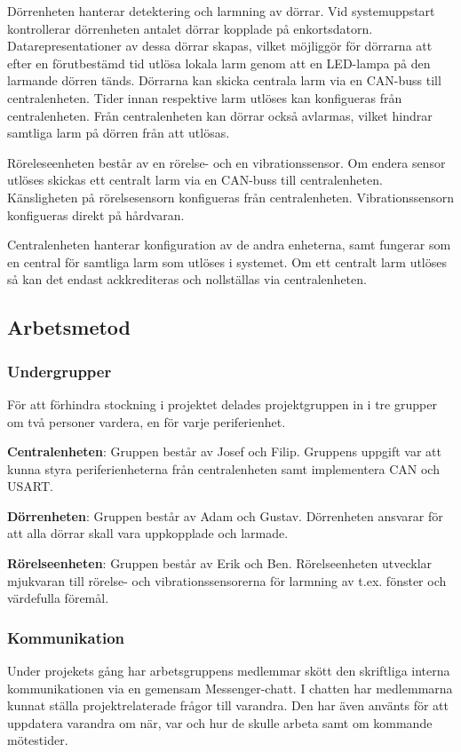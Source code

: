 \documentclass{article}
\begin{document}
Dörrenheten hanterar detektering och larmning av dörrar. Vid systemuppstart kontrollerar
dörrenheten antalet dörrar kopplade på enkortsdatorn. Datarepresentationer av
  dessa dörrar skapas, vilket möjliggör för dörrarna att efter en förutbestämd 
  tid utlösa lokala larm genom att en LED-lampa på den larmande dörren tänds. 
  Dörrarna kan skicka centrala larm via en CAN-buss till 
  centralenheten. Tider innan respektive larm utlöses kan konfigueras från centralenheten. 
  Från centralenheten kan dörrar också avlarmas, vilket hindrar 
  samtliga larm på dörren från att utlösas.

Röreleseenheten består av en rörelse- och en vibrationssensor. Om endera sensor 
utlöses skickas ett centralt larm via en CAN-buss till centralenheten. Känsligheten 
på rörelsesensorn konfigueras från centralenheten. Vibrationssensorn konfigueras direkt på hårdvaran.

Centralenheten hanterar konfiguration av de andra enheterna, samt fungerar som en 
central för samtliga larm som utlöses i systemet. Om ett centralt larm utlöses så 
kan det endast ackkrediteras och nollställas via centralenheten.

\subsection{Arbetsmetod} %
\subsubsection{Undergrupper}
För att förhindra stockning i projektet delades projektgruppen in i tre grupper om två personer vardera, 
en för varje periferienhet.

\textbf{Centralenheten}: Gruppen består av Josef och Filip. Gruppens uppgift var att kunna styra periferienheterna från centralenheten samt implementera CAN och USART.

\textbf{Dörrenheten}: Gruppen består av Adam och Gustav. Dörrenheten ansvarar för att alla dörrar 
skall vara uppkopplade och larmade.

\textbf{Rörelseenheten}: Gruppen består av Erik och Ben. Rörelseenheten utvecklar mjukvaran till 
rörelse- och vibrationssensorerna för larmning av t.ex. fönster och värdefulla föremål.

\subsubsection{Kommunikation}
Under projekets gång har arbetsgruppens medlemmar skött den skriftliga interna kommunikationen via en gemensam Messenger-chatt.
I chatten har medlemmarna kunnat ställa projektrelaterade
frågor till varandra. Den har även använts för att uppdatera varandra om när, var och hur de skulle arbeta samt om kommande mötestider.
\end{document}
